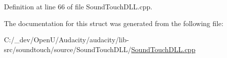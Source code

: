 Definition at line 66 of file Sound\+Touch\+D\+L\+L.\+cpp.



The documentation for this struct was generated from the following file\+:\begin{DoxyCompactItemize}
\item 
C\+:/\+\_\+dev/\+Open\+U/\+Audacity/audacity/lib-\/src/soundtouch/source/\+Sound\+Touch\+D\+L\+L/\hyperlink{_sound_touch_d_l_l_8cpp}{Sound\+Touch\+D\+L\+L.\+cpp}\end{DoxyCompactItemize}
